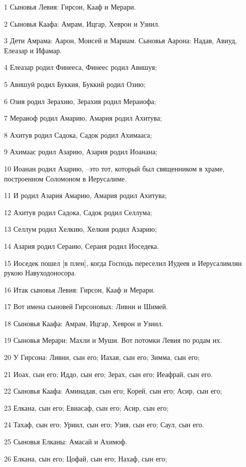 \par 1 Сыновья Левия: Гирсон, Кааф и Мерари.
\par 2 Сыновья Каафа: Амрам, Ицгар, Хеврон и Узиил.
\par 3 Дети Амрама: Аарон, Моисей и Мариам. Сыновья Аарона: Надав, Авиуд, Елеазар и Ифамар.
\par 4 Елеазар родил Финееса, Финеес родил Авишуя;
\par 5 Авишуй родил Буккия, Буккий родил Озию;
\par 6 Озия родил Зерахию, Зерахия родил Мераиофа;
\par 7 Мераиоф родил Амарию, Амария родил Ахитува;
\par 8 Ахитув родил Садока, Садок родил Ахимааса;
\par 9 Ахимаас родил Азарию, Азария родил Иоанана;
\par 10 Иоанан родил Азарию, --это тот, который был священником в храме, построенном Соломоном в Иерусалиме.
\par 11 И родил Азария Амарию, Амария родил Ахитува;
\par 12 Ахитув родил Садока, Садок родил Селлума;
\par 13 Селлум родил Хелкию, Хелкия родил Азарию;
\par 14 Азария родил Сераию, Сераия родил Иоседека.
\par 15 Иоседек пошел [в плен], когда Господь переселил Иудеев и Иерусалимлян рукою Навуходоносора.
\par 16 Итак сыновья Левия: Гирсон, Кааф и Мерари.
\par 17 Вот имена сыновей Гирсоновых: Ливни и Шимей.
\par 18 Сыновья Каафа: Амрам, Ицгар, Хеврон и Узиил.
\par 19 Сыновья Мерари: Махли и Муши. Вот потомки Левия по родам их.
\par 20 У Гирсона: Ливни, сын его; Иахав, сын его; Зимма, сын его;
\par 21 Иоах, сын его; Иддо, сын его; Зерах, сын его; Иеафрай, сын его.
\par 22 Сыновья Каафа: Аминадав, сын его; Корей, сын его; Асир, сын его;
\par 23 Елкана, сын его; Евиасаф, сын его; Асир, сын его;
\par 24 Тахаф, сын его; Уриил, сын его; Узия, сын его; Саул, сын его.
\par 25 Сыновья Елканы: Амасай и Ахимоф.
\par 26 Елкана, сын его; Цофай, сын его; Нахаф, сын его;
